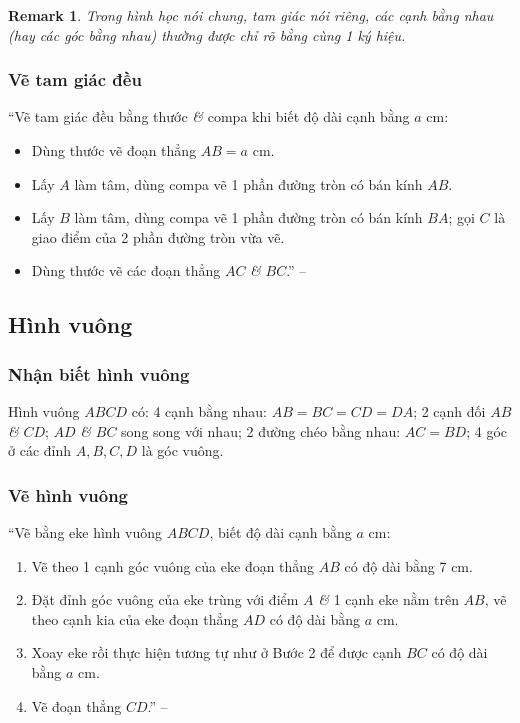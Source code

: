 \documentclass[oneside]{book}
\numberwithin{equation}{section}
\newtheorem{remark}{Remark}[section]
\begin{document}
\begin{remark}
	Trong hình học nói chung, tam giác nói riêng, các cạnh bằng nhau (hay các góc bằng nhau) thường được chỉ rõ bằng cùng 1 ký hiệu.
\end{remark}

\subsubsection{Vẽ tam giác đều}
``Vẽ tam giác đều bằng thước \textit{\&} compa khi biết độ dài cạnh bằng $a$ cm:
\begin{itemize}
	\item Dùng thước vẽ đoạn thẳng $AB = a$ cm.
	\item Lấy $A$ làm tâm, dùng compa vẽ 1 phần đường tròn có bán kính $AB$.
	\item Lấy $B$ làm tâm, dùng compa vẽ 1 phần đường tròn có bán kính $BA$; gọi $C$ là giao điểm của 2 phần đường tròn vừa vẽ.
	\item Dùng thước vẽ các đoạn thẳng $AC$ \textit{\&} $BC$.'' -- \cite[p. 94]{Thai_Anh_Dat_Ha_Loan_Nam_Quang_Toan_6_tap_1}
\end{itemize}

\subsection{Hình vuông}

\subsubsection{Nhận biết hình vuông}
Hình vuông $ABCD$ có: 4 cạnh bằng nhau: $AB = BC = CD = DA$; 2 cạnh đối $AB$ \textit{\&} $CD$; $AD$ \textit{\&} $BC$ song song với nhau; 2 đường chéo bằng nhau: $AC = BD$; 4 góc ở các đỉnh $A,B,C,D$ là góc vuông.

\subsubsection{Vẽ hình vuông}
``Vẽ bằng eke hình vuông $ABCD$, biết độ dài cạnh bằng $a$ cm:
\begin{enumerate}
	\item Vẽ theo 1 cạnh góc vuông của eke đoạn thẳng $AB$ có độ dài bằng 7 cm.
	\item Đặt đỉnh góc vuông của eke trùng với điểm $A$ \textit{\&} 1 cạnh eke nằm trên $AB$, vẽ theo cạnh kia của eke đoạn thẳng $AD$ có độ dài bằng $a$ cm.
	\item Xoay eke rồi thực hiện tương tự như ở Bước 2 để được cạnh $BC$ có độ dài bằng $a$ cm.
	\item Vẽ đoạn thẳng $CD$.'' -- \cite[p. 95]{Thai_Anh_Dat_Ha_Loan_Nam_Quang_Toan_6_tap_1}
\end{enumerate}
\end{document}
